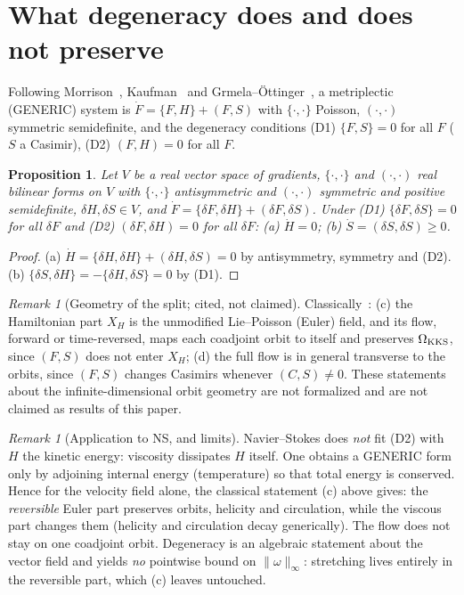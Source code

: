 \documentclass[11pt]{amsart}
\newtheorem{proposition}[theorem]{Proposition}
\theoremstyle{definition}\newtheorem{definition}[theorem]{Definition}
\theoremstyle{remark}\newtheorem{remark}[theorem]{Remark}
\begin{document}
\section{What degeneracy does and does not preserve}
Following Morrison~\cite{Morrison1986}, Kaufman~\cite{Kaufman1984} and Grmela--\"Ottinger~\cite{Grmela}, a metriplectic (GENERIC) system is
$\dot F=\{F,H\}+(F,S)$ with $\{\cdot,\cdot\}$ Poisson, $(\cdot,\cdot)$ symmetric semidefinite, and the degeneracy conditions
(D1) $\{F,S\}=0$ for all $F$ ($S$ a Casimir), (D2) $(F,H)=0$ for all $F$.
\begin{proposition}\label{prop:degen}
Let $V$ be a real vector space of gradients, $\{\cdot,\cdot\}$ and $(\cdot,\cdot)$ real bilinear forms on $V$ with $\{\cdot,\cdot\}$
antisymmetric and $(\cdot,\cdot)$ symmetric and positive semidefinite, $\delta H,\delta S\in V$, and
$\dot F=\{\delta F,\delta H\}+(\delta F,\delta S)$. Under (D1) $\{\delta F,\delta S\}=0$ for all $\delta F$ and (D2) $(\delta F,\delta H)=0$ for all $\delta F$:
(a) $\dot H=0$; (b) $\dot S=(\delta S,\delta S)\ge0$.
\end{proposition}
\begin{proof}(a) $\dot H=\{\delta H,\delta H\}+(\delta H,\delta S)=0$ by antisymmetry, symmetry and (D2). (b) $\{\delta S,\delta H\}=-\{\delta H,\delta S\}=0$ by (D1).\end{proof}
\begin{remark}[Geometry of the split; cited, not claimed]
Classically~\cite{Morrison1986,MarsdenRatiu}: (c) the Hamiltonian part $X_H$ is the unmodified Lie--Poisson (Euler) field, and its flow,
forward or time-reversed, maps each coadjoint orbit to itself and preserves $\Omega_{\rm KKS}$, since $(F,S)$ does not enter $X_H$;
(d) the full flow is in general transverse to the orbits, since $(F,S)$ changes Casimirs whenever $(C,S)\neq0$. These statements
about the infinite-dimensional orbit geometry are not formalized and are not claimed as results of this paper.
\end{remark}
\begin{remark}[Application to NS, and limits]
Navier--Stokes does \emph{not} fit (D2) with $H$ the kinetic energy: viscosity dissipates $H$ itself. One obtains a GENERIC form only by
adjoining internal energy (temperature) so that total energy is conserved. Hence for the velocity field alone, the classical statement (c) above gives: the
\emph{reversible} Euler part preserves orbits, helicity and circulation, while the viscous part changes them (helicity and circulation decay generically).
The flow does not stay on one coadjoint orbit. Degeneracy is an algebraic statement about the vector field and yields
\emph{no} pointwise bound on $\|\omega\|_\infty$: stretching lives entirely in the reversible part, which (c) leaves untouched.
\end{remark}
\end{document}
